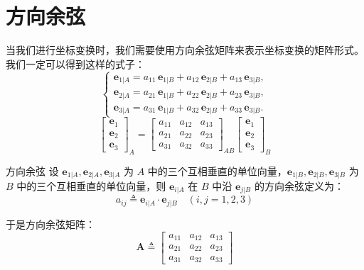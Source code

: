 \section{方向余弦}\label{sec:direction-cosines}
当我们进行坐标变换时，我们需要使用方向余弦矩阵来表示坐标变换的矩阵形式。
我们一定可以得到这样的式子：
\begin{equation}
    \left\{\begin{array}{l}
\mathbf{e}_{1|A} = a_{11}\,\mathbf{e}_{1|B} + a_{12}\,\mathbf{e}_{2|B} + a_{13}\,\mathbf{e}_{3|B},\\
\mathbf{e}_{2|A} = a_{21}\,\mathbf{e}_{1|B} + a_{22}\,\mathbf{e}_{2|B} + a_{23}\,\mathbf{e}_{3|B},\\
\mathbf{e}_{3|A} = a_{31}\,\mathbf{e}_{1|B} + a_{32}\,\mathbf{e}_{2|B} + a_{33}\,\mathbf{e}_{3|B}.
\end{array}\right.
\end{equation}
\begin{equation}
    \begin{bmatrix}\bm{e}_{1}\\\bm{e}_{2}\\\bm{e}_{3}\end{bmatrix}_A=\begin{bmatrix}a_{11}&a_{12}&a_{13}\\a_{21}&a_{22}&a_{23}\\a_{31}&a_{32}&a_{33}\end{bmatrix}_{AB}\begin{bmatrix}\bm{e}_{1}\\\bm{e}_{2}\\\bm{e}_{3}\end{bmatrix}_B
\end{equation}
\begin{mydefinition}{方向余弦}
设 $\bm{e}_{1|A}, \bm{e}_{2|A}, \bm{e}_{3|A}$ 为 $A$ 中的三个互相垂直的单位向量，$\bm{e}_{1|B}, \bm{e}_{2|B}, \bm{e}_{3|B}$ 为 $B$ 中的三个互相垂直的单位向量，则 $\bm{e}_{i|A}$ 在 $B$ 中沿 $\bm{e}_{j|B}$ 的方向余弦定义为：
\begin{equation}
    a_{ij}\triangleq\mathbf{e}_{i|A}\cdot\mathbf{e}_{j|B}\quad(i,j=1,2,3)
    \label{eq:方向余弦的定义}
\end{equation}


\end{mydefinition}
于是方向余弦矩阵：
\begin{equation}
    \label{eq:direction_cosine_matrix}
    \bm{A} \triangleq
    \begin{bmatrix}
        a_{11} & a_{12} & a_{13} \\
        a_{21} & a_{22} & a_{23} \\
        a_{31} & a_{32} & a_{33}
    \end{bmatrix}
\end{equation}

